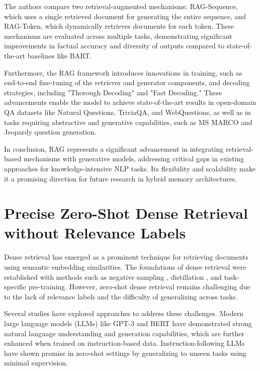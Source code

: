 The authors compare two retrieval-augmented mechanisms: RAG-Sequence, which uses a single retrieved document for generating the entire sequence, and RAG-Token, which dynamically retrieves documents for each token. These mechanisms are evaluated across multiple tasks, demonstrating significant improvements in factual accuracy and diversity of outputs compared to state-of-the-art baselines like BART.

Furthermore, the RAG framework introduces innovations in training, such as end-to-end fine-tuning of the retriever and generator components, and decoding strategies, including "Thorough Decoding" and "Fast Decoding." These advancements enable the model to achieve state-of-the-art results in open-domain QA datasets like Natural Questions, TriviaQA, and WebQuestions, as well as in tasks requiring abstractive and generative capabilities, such as MS MARCO and Jeopardy question generation.

In conclusion, RAG represents a significant advancement in integrating retrieval-based mechanisms with generative models, addressing critical gaps in existing approaches for knowledge-intensive NLP tasks. Its flexibility and scalability make it a promising direction for future research in hybrid memory architectures.

\section*{Precise Zero-Shot Dense Retrieval without Relevance Labels\cite{hyde}}


Dense retrieval has emerged as a prominent technique for retrieving documents using semantic embedding similarities. The foundations of dense retrieval were established with methods such as negative sampling \cite{xu2022negativesamplingcontrastiverepresentation}, distillation \cite{hinton2015distillingknowledgeneuralnetwork}, and task-specific pre-training. However, zero-shot dense retrieval remains challenging due to the lack of relevance labels and the difficulty of generalizing across tasks.

Several studies have explored approaches to address these challenges. Modern large language models (LLMs) like GPT-3 \cite{gpt3} and BERT \cite{devlin2019bertpretrainingdeepbidirectional} have demonstrated strong natural language understanding and generation capabilities, which are further enhanced when trained on instruction-based data. Instruction-following LLMs have shown promise in zero-shot settings by generalizing to unseen tasks using minimal supervision.

